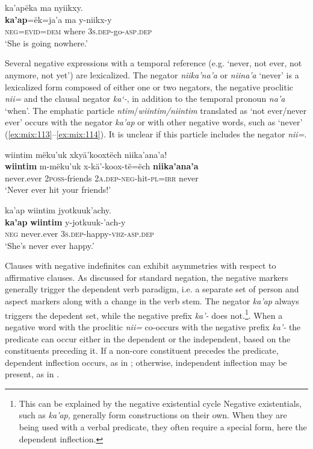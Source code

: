 \documentclass[output=paper,colorlinks,citecolor=brown,draft]{langscibook}
\begin{document}
\ea\label{ex:mix:112}
    \glll ka’apëka ma nyiikxy. \\
          \textbf{ka’ap}=ëk=ja’a ma y-niikx-y\\
          \textsc{neg=evid=dem} where 3\textsc{s.dep}{}-go-\textsc{asp.dep}\\
    \glt ‘She is going nowhere.’
\z

Several negative expressions with a temporal reference (e.g. ‘never, not ever, not anymore, not yet’) are lexicalized. The negator \textit{niika’na’a} or \textit{niina’a} ‘never’ is a lexicalized form composed of either one or two negators, the negative proclitic \textit{nii=} and the clausal negator \textit{ka‘-}, in addition to the temporal pronoun \textit{na’a} ‘when’. The emphatic particle \textit{ntim}/\textit{wiintim/niintim} translated as ‘not ever/never ever’ occurs with the negator \textit{ka’ap} or with other negative words, such as ‘never’ (\ref{ex:mix:113}--\ref{ex:mix:114}). It is unclear if this particle includes the negator \textit{nii=}.  

\ea\label{ex:mix:113}
    \glll wiintim mëku’uk xkyä’kooxtëch niika’ana’a!\\
          \textbf{wiintim} m-mëku’uk x-kä’-koox-të=ëch \textbf{niika’ana’a}\\
          never.ever \textsc{2poss-}friends \textsc{2a.dep-neg}{}-hit-\textsc{pl=irr} never\\
    \glt ‘Never ever hit your friends!’
\z

\ea\label{ex:mix:114}
    \glll ka’ap wiintim jyotkuuk’achy.\\
          \textbf{ka’ap} \textbf{wiintim} y-jotkuuk-’ach-y\\
          \textsc{neg} never.ever \textsc{3s.dep-}happy-\textsc{vbz-asp.dep}\\
    \glt ‘She’s never ever happy.’
\z

Clauses with negative indefinites can exhibit asymmetries with respect to affirmative clauses. As discussed for standard negation, the negative markers generally trigger the dependent verb paradigm, i.e. a separate set of person and aspect markers along with a change in the verb stem. The negator \textit{ka’ap} always triggers the depedent set, while the negative prefix \textit{ka’-} does not.\footnote{This can be explained by the negative existential cycle \citep{Veselinova2016} Negative existentials, such as \textit{ka’ap}, generally form constructions on their own. When they are being used with a verbal predicate, they often require a special form, here the dependent inflection.}. When a negative word with the proclitic \textit{nii=} co-occurs with the negative prefix \textit{ka’-} the predicate can occur either in the dependent or the independent, based on the constituents preceding it. If a non\nobreakdash-core constituent precedes the predicate, dependent inflection occurs, as in ; otherwise, independent inflection may be present, as in .
\end{document}
